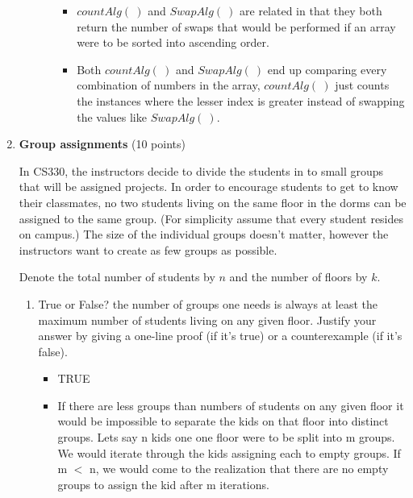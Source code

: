 \documentclass[11pt]{article}
\begin{document}
\begin{enumerate}
\begin{enumerate}
\begin{enumerate}
            \begin{itemize}
                \color{teal}
                \item $countAlg\left( \  \right) $ and $SwapAlg\left( \  \right) $ are related in that they both return the number of swaps that would be performed if an array were to be sorted into ascending order.
                \item Both $countAlg\left( \  \right) $ and $SwapAlg\left( \  \right) $ end up comparing every combination of numbers in the array, $countAlg\left( \  \right) $ just counts the instances where the lesser index is greater instead of swapping the values like $SwapAlg\left( \  \right) $.
            \end{itemize}
        
    \end{enumerate}
    
 

 
    \end{enumerate}


\item \textbf{Group assignments} (10 points)



In CS330, the instructors decide to divide the students in to small groups that will be assigned projects. In order to encourage students to get to know their classmates,  no two students living on the same floor in the dorms can be assigned to the same group. (For simplicity assume that every student resides on campus.)  The size of the individual groups doesn't matter, however the instructors want to create as few groups as possible. 

Denote the total number of students by $n$ and the number of floors by $k$.


\begin{enumerate}
\item 
 True or False? the number of groups one needs is
always at least the maximum number of  students living on any given
floor. Justify your answer by giving a one-line proof (if it's true) or
a counterexample (if it's false).
    \begin{itemize}
        \color{teal}
        \item TRUE
        \item If there are less groups than numbers of students on any given floor it would be impossible to separate the kids on that floor into distinct groups. Lets say n kids one one floor were to be split into m groups. We would iterate through the kids assigning each to empty groups. If m $<$ n, we would come to the realization that there are no empty groups to assign the kid after m iterations.
    \end{itemize}


\end{enumerate}
\end{enumerate}
\end{document}
